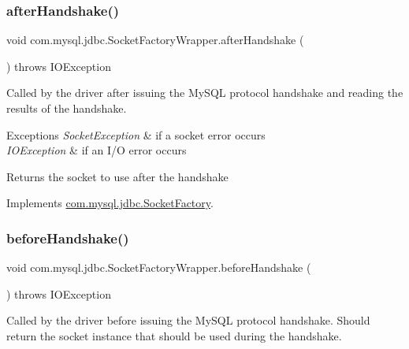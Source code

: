 \subsubsection{\texorpdfstring{after\+Handshake()}{afterHandshake()}}
{\footnotesize\ttfamily void com.\+mysql.\+jdbc.\+Socket\+Factory\+Wrapper.\+after\+Handshake (\begin{DoxyParamCaption}{ }\end{DoxyParamCaption}) throws I\+O\+Exception}

Called by the driver after issuing the My\+S\+QL protocol handshake and reading the results of the handshake.


\begin{DoxyExceptions}{Exceptions}
{\em Socket\+Exception} & if a socket error occurs \\
\hline
{\em I\+O\+Exception} & if an I/O error occurs\\
\hline
\end{DoxyExceptions}
\begin{DoxyReturn}{Returns}
the socket to use after the handshake 
\end{DoxyReturn}


Implements \mbox{\hyperlink{interfacecom_1_1mysql_1_1jdbc_1_1_socket_factory_adc5277dd008da61b24261a983202f5bf}{com.\+mysql.\+jdbc.\+Socket\+Factory}}.

\mbox{\label{classcom_1_1mysql_1_1jdbc_1_1_socket_factory_wrapper_a6c39038cbdf685cde6e0ce84cecde918}} 
\subsubsection{\texorpdfstring{before\+Handshake()}{beforeHandshake()}}
{\footnotesize\ttfamily void com.\+mysql.\+jdbc.\+Socket\+Factory\+Wrapper.\+before\+Handshake (\begin{DoxyParamCaption}{ }\end{DoxyParamCaption}) throws I\+O\+Exception}

Called by the driver before issuing the My\+S\+QL protocol handshake. Should return the socket instance that should be used during the handshake.


